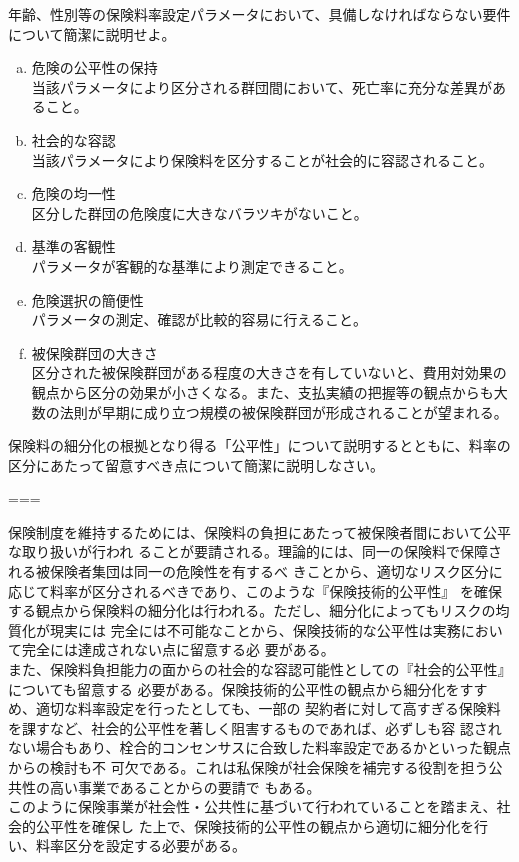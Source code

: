 \documentclass[report,gutter=10mm,fore-edge=10mm,uplatex,dvipdfmx]{jlreq}
\begin{document}

年齢、性別等の保険料率設定パラメータにおいて、具備しなければならない要件について簡潔に説明せよ。



\begin{enumerate}[a. ]
\item
  危険の公平性の保持\\
  当該パラメータにより区分される群団間において、死亡率に充分な差異があること。
\item
  社会的な容認\\
  当該パラメータにより保険料を区分することが社会的に容認されること。
\item
  危険の均一性\\ 区分した群団の危険度に大きなバラツキがないこと。
\item
  基準の客観性\\ パラメータが客観的な基準により測定できること。
\item
  危険選択の簡便性\\ パラメータの測定、確認が比較的容易に行えること。
\item
  被保険群団の大きさ\\
  区分された被保険群団がある程度の大きさを有していないと、費用対効果の観点から区分の効果が小さくなる。また、支払実績の把握等の観点からも大数の法則が早期に成り立つ規模の被保険群団が形成されることが望まれる。
\end{enumerate}


保険料の細分化の根拠となり得る「公平性」について説明するとともに、料率の区分にあたって留意すべき点について簡潔に説明しなさい。

===


保険制度を維持するためには、保険料の負担にあたって被保険者間において公平な取り扱いが行われ
ることが要請される。理論的には、同一の保険料で保障される被保険者集団は同一の危険性を有するべ
きことから、適切なリスク区分に応じて料率が区分されるべきであり、このような『保険技術的公平性』
を確保する観点から保険料の細分化は行われる。ただし、細分化によってもリスクの均質化が現実には
完全には不可能なことから、保険技術的な公平性は実務において完全には達成されない点に留意する必
要がある。\\
また、保険料負担能力の面からの社会的な容認可能性としての『社会的公平性』についても留意する
必要がある。保険技術的公平性の観点から細分化をすすめ、適切な料率設定を行ったとしても、一部の
契約者に対して高すぎる保険料を課すなど、社会的公平性を著しく阻害するものであれば、必ずしも容
認されない場合もあり、栓合的コンセンサスに合致した料率設定であるかといった観点からの検討も不
可欠である。これは私保険が社会保険を補完する役割を担う公共性の高い事業であることからの要請で
もある。\\
このように保険事業が社会性・公共性に基づいて行われていることを踏まえ、社会的公平性を確保し
た上で、保険技術的公平性の観点から適切に細分化を行い、料率区分を設定する必要がある。\\
\end{document}
